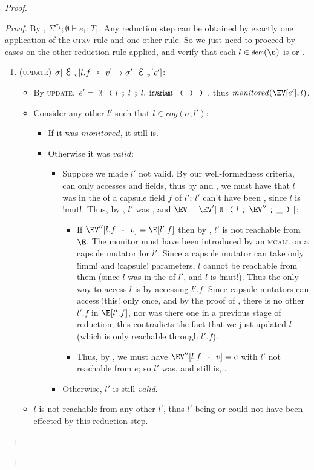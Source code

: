 \begin{proof}
\begin{proof}
By , $\Sigma^{\sigma_1};\emptyset\vdash e_1: T_1$. Any reduction step can be obtained by exactly one application of the \textsc{ctxv} rule and one other rule. So we just need to proceed by cases on the other reduction rule applied, and verify that each $l \in \dom(\s)$ is \valid or \mony.
\SSI\begin{enumerate}
\item (\textsc{update}) $\sigma|\ctx_v[l.f\equals v]\rightarrow \sigma'|\ctx_v[\e']$:
	\begin{itemize}
	  \item By \textsc{update}, $\e'=\M{l}{l}{l.\invariant}$, thus $\mathit{monitored}(\EV[e'],l)$.
	  \item Consider any other $l'$ such that $l\in \mathit{rog}(\sigma,l')$:
	  \begin{itemize}
	  	\item If it was $\mathit{monitored}$, it still is.
	    \item Otherwise it was $\mathit{valid}$:
			\begin{itemize}
				\item Suppose we made $l'$ not valid. By our well-formedness criteria, \Q@invariant@ can only accesses \Q@imm@ and \Q@capsule@ fields, thus by  and , we must have that $l$ was in the \rog of a capsule field $f$ of $l'$; $l'$ can't have been \CNE, since $l$ is \Q!mut!. Thus, by \CFS, $l'$ was \CNO, and $\EV = \EV'[\M{l}{\EV''}{\_}]$:
				\begin{itemize}
					\item If $\EV''[l.f \equals v] = \E[l'.f]$ then by \CNO, $l'$ is not reachable from $\E$. The monitor must have been introduced by an \textsc{mcall} on a capsule mutator for $l'$. Since a capsule mutator can take only \Q!imm! and \Q!capsule! parameters, $l$ cannot be reachable from them (since $l$ was in the \rog of $l'$, and $l$ is \Q!mut!). Thus the only way to access $l$ is by accessing $l'.f$.
					Since capsule mutators can access \Q!this! only once, and by the proof of \CFS, there is no other $l'.f$ in $\E[l'.f]$, nor was there one in a previous stage of reduction; this contradicts the fact that we just updated $l$ (which is only reachable through $l'.f$).
					\item Thus, by \CNO, we must have $\EV''[l.f \equals v] = e$ with $l'$ not reachable from $e$; so $l'$ was, and still is, \mony.
				\end{itemize}
				\item Otherwise, $l'$ is still \emph{valid}.
		  	\end{itemize}
	  \end{itemize}
	  \item $l$ is not reachable from any other $l'$, thus $l'$ being \valid or \mony could not have been effected by this reduction step.
	\end{itemize}


\end{enumerate}
\end{proof}
\end{proof}
